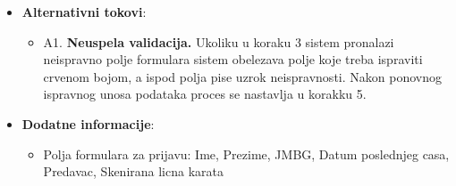 \begin{itemize}
  \item \textbf{Alternativni tokovi}:
      \begin{itemize}
        \item A1. \textbf{Neuspela validacija.}
        Ukoliku u koraku 3 sistem pronalazi neispravno polje formulara sistem obelezava polje koje treba ispraviti crvenom bojom, a ispod polja pise  uzrok neispravnosti. Nakon ponovnog ispravnog unosa podataka proces se nastavlja u korakku 5.
      \end{itemize}
      
  \item \textbf{Dodatne informacije}:
      \begin{itemize}
        \item Polja formulara za prijavu: Ime, Prezime, JMBG, Datum poslednjeg casa, Predavac, Skenirana licna karata 
      \end{itemize}
\end{itemize}